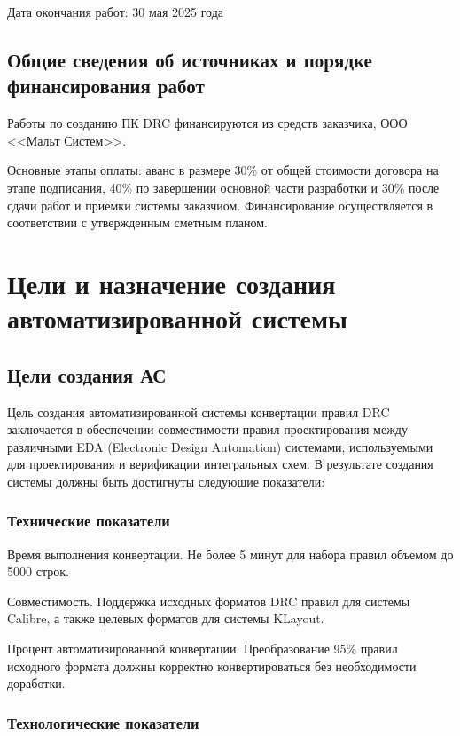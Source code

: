 Дата окончания работ: 30 мая 2025 года

\subsection{Общие сведения об источниках и порядке финансирования работ}

Работы по созданию ПК DRC финансируются из средств заказчика,
ООО <<Мальт Систем>>.

Основные этапы оплаты:
аванс в размере 30\% от общей стоимости договора на этапе подписания,
40\% по завершении основной части разработки
и 30\% после сдачи работ и приемки системы заказчиом.
Финансирование осуществляется в соответствии с утвержденным сметным планом.

\section{Цели и назначение создания автоматизированной системы}

\subsection{Цели создания АС}

Цель создания автоматизированной системы конвертации правил DRC заключается
в обеспечении совместимости правил проектирования
между различными EDA (Electronic Design Automation) системами,
используемыми для проектирования и верификации интегральных схем.
В результате создания системы должны быть достигнуты следующие показатели:

\subsubsection{Технические показатели}

Время выполнения конвертации.
Не более 5 минут для набора правил объемом до 5000 строк.

Совместимость.
Поддержка исходных форматов DRC правил для системы Calibre,
а также целевых форматов для системы KLayout.

Процент автоматизированной конвертации.
Преобразование 95\% правил исходного формата должны корректно
конвертироваться без необходимости доработки.

\subsubsection{Технологические показатели}

